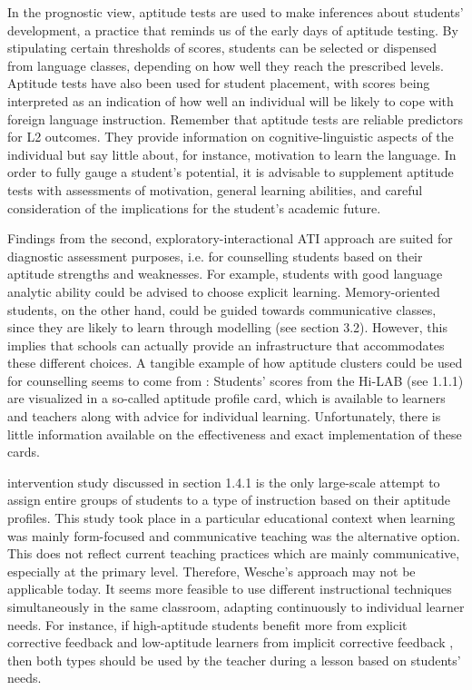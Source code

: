 \documentclass[output=paper]{langscibook}
\begin{document}
In the prognostic view, aptitude tests are used to make inferences about students’ development, a practice that reminds us of the early days of aptitude testing. By stipulating certain thresholds of scores, students can be selected or dispensed from language classes, depending on how well they reach the prescribed levels. Aptitude tests have also been used for student placement, with scores being interpreted as an indication of how well an individual will be likely to cope with foreign language instruction. Remember that aptitude tests are reliable predictors for L2 outcomes. They provide information on cognitive-linguistic aspects of the individual but say little about, for instance, motivation to learn the language. In order to fully gauge a student’s potential, it is advisable to supplement aptitude tests with assessments of motivation, general learning abilities, and careful consideration of the implications for the student’s academic future.

Findings from the second, exploratory-interactional ATI approach are suited for diagnostic assessment purposes, i.e. for counselling students based on their aptitude strengths and weaknesses. For example, students with good language analytic ability could be advised to choose explicit learning. Memory-oriented students, on the other hand, could be guided towards communicative classes, since they are likely to learn through modelling (see section 3.2). However, this implies that schools can actually provide an infrastructure that accommodates these different choices. A tangible example of how aptitude clusters could be used for counselling seems to come from \citet{Doughty2013}: Students’ scores from the Hi-LAB (see 1.1.1) are visualized in a so-called aptitude profile card, which is available to learners and teachers along with advice for individual learning. Unfortunately, there is little information available on the effectiveness and exact implementation of these cards. 

 intervention study discussed in section 1.4.1 is the only large-scale attempt to assign entire groups of students to a type of instruction based on their aptitude profiles. This study took place in a particular educational context when learning was mainly form-focused and communicative teaching was the alternative option. This does not reflect current teaching practices which are mainly communicative, especially at the primary level. Therefore, Wesche’s approach may not be applicable today. It seems more feasible to use different instructional techniques simultaneously in the same classroom, adapting continuously to individual learner needs. For instance, if high-aptitude students benefit more from explicit corrective feedback and low-aptitude learners from implicit corrective feedback \citep{Li2017}, then both types should be used by the teacher during a lesson based on students’ needs. 
\end{document}
